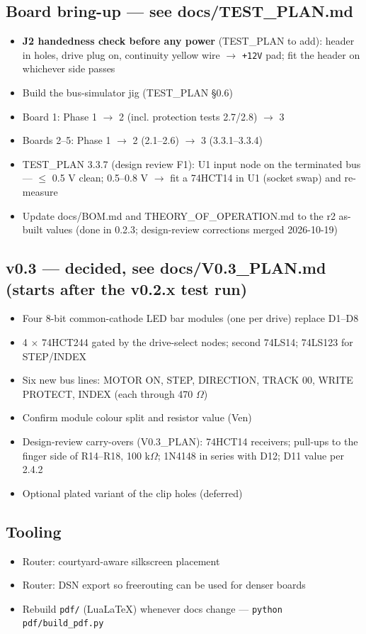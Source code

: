 \documentclass[11pt,a4paper]{article}
\begin{document}
\subsection*{Board bring-up — see docs/TEST\_PLAN.md}
\begin{itemize}[leftmargin=8mm]
\item[$\square$] \textbf{J2 handedness check before any power} (TEST\_PLAN to add): header in holes, drive plug on, continuity yellow wire $\to$ \texttt{+12V} pad; fit the header on whichever side passes
\item[$\square$] Build the bus-simulator jig (TEST\_PLAN §0.6)
\item[$\square$] Board 1: Phase 1 $\to$ 2 (incl. protection tests 2.7/2.8) $\to$ 3
\item[$\square$] Boards 2–5: Phase 1 $\to$ 2 (2.1–2.6) $\to$ 3 (3.3.1–3.3.4)
\item[$\square$] TEST\_PLAN 3.3.7 (design review F1): U1 input node on the terminated bus — $\le$ 0.5 V clean; 0.5–0.8 V $\to$ fit a 74HCT14 in U1 (socket swap) and re-measure
\item[$\boxtimes$] Update docs/BOM.md and THEORY\_OF\_OPERATION.md to the r2 as-built values (done in 0.2.3; design-review corrections merged 2026-10-19)
\end{itemize}
\subsection*{v0.3 — decided, see docs/V0.3\_PLAN.md (starts after the v0.2.x test run)}
\begin{itemize}[leftmargin=8mm]
\item[$\square$] Four 8-bit common-cathode LED bar modules (one per drive) replace D1–D8
\item[$\square$] 4 $\times$ 74HCT244 gated by the drive-select nodes; second 74LS14; 74LS123 for STEP/INDEX
\item[$\square$] Six new bus lines: MOTOR ON, STEP, DIRECTION, TRACK 00, WRITE PROTECT, INDEX (each through 470 $\Omega$)
\item[$\square$] Confirm module colour split and resistor value (Ven)
\item[$\square$] Design-review carry-overs (V0.3\_PLAN): 74HCT14 receivers; pull-ups to the finger side of R14–R18, 100 k$\Omega$; 1N4148 in series with D12; D11 value per 2.4.2
\item[$\square$] Optional plated variant of the clip holes (deferred)
\end{itemize}
\subsection*{Tooling}
\begin{itemize}[leftmargin=8mm]
\item[$\square$] Router: courtyard-aware silkscreen placement
\item[$\square$] Router: DSN export so freerouting can be used for denser boards
\item[$\square$] Rebuild \texttt{pdf/} (LuaLaTeX) whenever docs change — \texttt{python pdf/build\_pdf.py}
\end{itemize}
\end{document}
